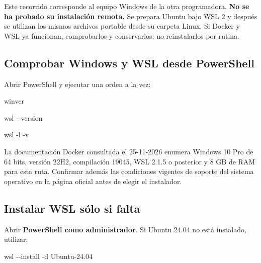 \documentclass[
  spanish,
  10pt,
  a4paper,
]{article}
\newenvironment{Shaded}{}{}
\newcommand{\DecValTok}[1]{#1}
\newcommand{\NormalTok}[1]{#1}
\newcommand{\OperatorTok}[1]{#1}
\renewenvironment{Shaded}{\begin{snugshade}}{\end{snugshade}}%
\begin{document}
Este recorrido corresponde al equipo Windows de la otra programadora.
\textbf{No se ha probado su instalación remota.} Se prepara Ubuntu bajo
WSL 2 y después se utilizan los mismos archivos portable desde su
carpeta Linux. Si Docker y WSL ya funcionan, comprobarlos y
conservarlos; no reinstalarlos por rutina.

\subsection{Comprobar Windows y WSL desde
PowerShell}\label{comprobar-windows-y-wsl-desde-powershell}

Abrir PowerShell y ejecutar una orden a la vez:

\begin{Shaded}
\begin{Highlighting}[]
\NormalTok{winver}
\end{Highlighting}
\end{Shaded}

\begin{Shaded}
\begin{Highlighting}[]
\NormalTok{wsl }\OperatorTok{{-}{-}}\NormalTok{version}
\end{Highlighting}
\end{Shaded}

\begin{Shaded}
\begin{Highlighting}[]
\NormalTok{wsl }\OperatorTok{{-}}\NormalTok{l }\OperatorTok{{-}}\NormalTok{v}
\end{Highlighting}
\end{Shaded}

La documentación Docker consultada el 25-11-2026 enumera Windows 10 Pro
de 64 bits, versión 22H2, compilación 19045, WSL 2.1.5 o posterior y 8
GB de RAM para esta ruta. Confirmar además las condiciones vigentes de
soporte del sistema operativo en la página oficial antes de elegir el
instalador.

\subsection{Instalar WSL sólo si
falta}\label{instalar-wsl-suxf3lo-si-falta}

Abrir \textbf{PowerShell como administrador}. Si Ubuntu 24.04 no está
instalado, utilizar:

\begin{Shaded}
\begin{Highlighting}[]
\NormalTok{wsl }\OperatorTok{{-}{-}}\NormalTok{install }\OperatorTok{{-}}\NormalTok{d Ubuntu{-}24}\OperatorTok{.}\DecValTok{04}
\end{Highlighting}
\end{Shaded}
\end{document}
